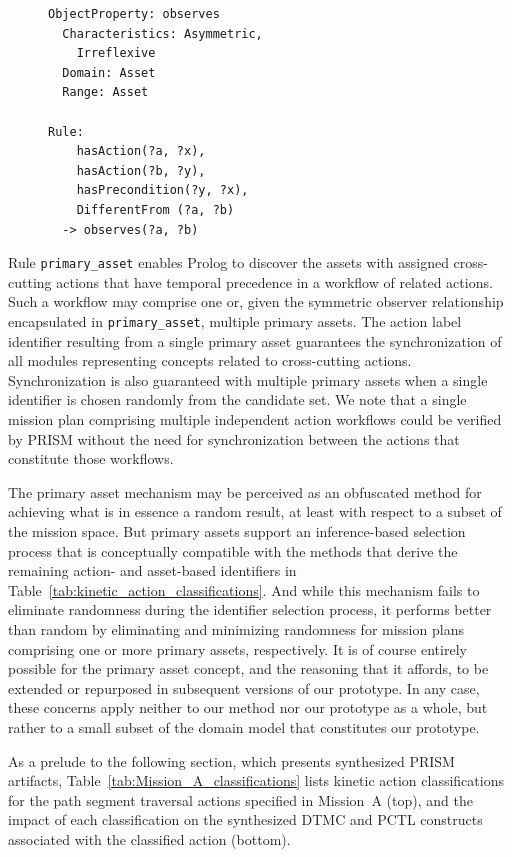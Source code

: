 \begin{figure}[ht]
\begin{lstlisting}[caption={OWL+SWRL code for the object property \texttt{observes}},label=lst:OWL_object_property_observes]
ObjectProperty: observes
  Characteristics: Asymmetric,
    Irreflexive
  Domain: Asset
  Range: Asset

Rule:
    hasAction(?a, ?x),
    hasAction(?b, ?y),
    hasPrecondition(?y, ?x),
    DifferentFrom (?a, ?b)
  -> observes(?a, ?b)
\end{lstlisting}
\end{figure}

Rule \texttt{primary\_asset} enables Prolog to discover the assets with assigned cross-cutting actions that have temporal precedence in a workflow of related actions. Such a workflow may comprise one or, given the symmetric observer relationship encapsulated in \texttt{primary\_asset}, multiple primary assets. The action label identifier resulting from a single primary asset guarantees the synchronization of all modules representing concepts related to cross-cutting actions. Synchronization is also guaranteed with multiple primary assets when a single identifier is chosen randomly from the candidate set. We note that a single mission plan comprising multiple independent action workflows could be verified by PRISM without the need for synchronization between the actions that constitute those workflows.

The primary asset mechanism may be perceived as an obfuscated method for achieving what is in essence a random result, at least with respect to a subset of the mission space. But primary assets support an inference-based selection process that is conceptually compatible with the methods that derive the remaining action- and asset-based identifiers in Table~\ref{tab:kinetic_action_classifications}. And while this mechanism fails to eliminate randomness during the identifier selection process, it performs better than random by eliminating and minimizing randomness for mission plans comprising one or more primary assets, respectively. It is of course entirely possible for the primary asset concept, and the reasoning that it affords, to be extended or repurposed in subsequent versions of our prototype. In any case, these concerns apply neither to our method nor our prototype as a whole, but rather to a small subset of the domain model that constitutes our prototype.

As a prelude to the following section, which presents synthesized PRISM artifacts, Table~\ref{tab:Mission_A_classifications} lists kinetic action classifications for the path segment traversal actions specified in Mission~A (top), and the impact of each classification on the synthesized DTMC and PCTL constructs associated with the classified action (bottom).

